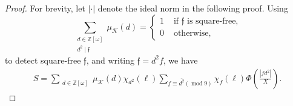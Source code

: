 \documentclass[10pt,a4paper]{amsart}
\newcommand{\mymod}[1]{(\operatorname{mod} #1)}
\begin{document}
\begin{proof} For brevity, let $|\cdot|$ denote the ideal norm in the following proof. Using 
\begin{equation}\label{detect-square}
\sum_{\substack{d\in \mathbb{Z}[\omega]\\d^2\mid \mathfrak{f}}}\mu_\mathcal{K}(d)=\begin{cases}
    1 &\text{ if } \mathfrak{f} \text{ is square-free,}\\
    0 &\text{ otherwise,}
\end{cases}
\end{equation}
to detect square-free $\mathfrak{f}$, and writing $\mathfrak{f}=d^2f$, we have
    \begin{align*}
    S
    =
    \sum_{\substack{d\in \mathbb{Z}[\omega]}}\mu_\mathcal{K}(d)\chi_{d^2}(\ell)
    \sum_{f \equiv \overline{d^2}\mymod9}\chi_{f}(\ell)\Phi\left(\frac{|fd^2|}{X}\right).
\end{align*}


\end{proof}
\end{document}
